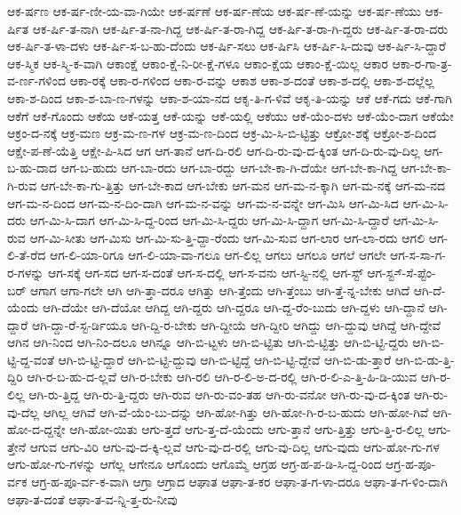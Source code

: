 {ಆಕ-ರ್ಷಣ
ಆಕ-ರ್ಷ-ಣೀ-ಯ-ವಾ-ಗಿಯೇ
ಆಕ-ರ್ಷಣೆ
ಆಕ-ರ್ಷ-ಣೆಯ
ಆಕ-ರ್ಷ-ಣೆ-ಯನ್ನು
ಆಕ-ರ್ಷ-ಣೆಯು
ಆಕ-ರ್ಷಿತ
ಆಕ-ರ್ಷಿ-ತ-ನಾಗಿ
ಆಕ-ರ್ಷಿ-ತ-ನಾ-ಗಿದ್ದ
ಆಕ-ರ್ಷಿ-ತ-ರಾ-ಗಿದ್ದ
ಆಕ-ರ್ಷಿ-ತ-ರಾ-ಗಿ-ದ್ದರು
ಆಕ-ರ್ಷಿ-ತ-ರಾ-ದರು
ಆಕ-ರ್ಷಿ-ತ-ಳಾ-ದಳು
ಆಕ-ರ್ಷಿ-ಸ-ಬ-ಹು-ದೆಂದು
ಆಕ-ರ್ಷಿ-ಸಲು
ಆಕ-ರ್ಷಿಸಿ
ಆಕ-ರ್ಷಿ-ಸಿ-ದುವು
ಆಕ-ರ್ಷಿ-ಸಿ-ದ್ದಾರೆ
ಆಕ-ಸ್ಮಿಕ
ಆಕ-ಸ್ಮಿ-ಕ-ವಾಗಿ
ಆಕಾಂಕ್ಷೆ
ಆಕಾಂ-ಕ್ಷೆ-ನಿ-ರೀ-ಕ್ಷೆ-ಗಳೂ
ಆಕಾಂ-ಕ್ಷೆಯ
ಆಕಾಂ-ಕ್ಷೆ-ಯಿಲ್ಲ
ಆಕಾರ
ಆಕಾ-ರ-ಗಾ-ತ್ರ-ವ-ರ್ಣ-ಗಳಿಂದ
ಆಕಾ-ರಕ್ಕೆ
ಆಕಾ-ರ-ಗಳಿಂದ
ಆಕಾ-ರ-ವನ್ನು
ಆಕಾಶ
ಆಕಾ-ಶ-ದಂತೆ
ಆಕಾ-ಶ-ದಲ್ಲಿ
ಆಕಾ-ಶ-ದಲ್ಲೆಲ್ಲ
ಆಕಾ-ಶ-ದಿಂದ
ಆಕಾ-ಶ-ಬಾ-ಣ-ಗಳನ್ನು
ಆಕಾ-ಶ-ಯಾ-ನದ
ಆಕೃ-ತಿ-ಗ-ಳಿವೆ
ಆಕೃ-ತಿ-ಯನ್ನು
ಆಕೆ
ಆಕೆ-ಗದು
ಆಕೆ-ಗಾಗಿ
ಆಕೆಗೆ
ಆಕೆ-ಗೊಂದು
ಆಕೆಯ
ಆಕೆ-ಯತ್ತ
ಆಕೆ-ಯನ್ನು
ಆಕೆ-ಯಲ್ಲಿ
ಆಕೆಯು
ಆಕೆ-ಯೆಂ-ದಳು
ಆಕೆ-ಯೆಂ-ದಾಗ
ಆಕೆಯೇ
ಆಕ್ರಂ-ದ-ನಕ್ಕೆ
ಆಕ್ರ-ಮಣ
ಆಕ್ರ-ಮ-ಣ-ಗಳ
ಆಕ್ರ-ಮ-ಣ-ದಿಂದ
ಆಕ್ರ-ಮಿ-ಸಿ-ಬಿ-ಟ್ಟಿತ್ತು
ಆಕ್ರೋ-ಶಕ್ಕೆ
ಆಕ್ರೋ-ಶ-ದಿಂದ
ಆಕ್ಷೇ-ಪ-ಣೆ-ಯೆತ್ತಿ
ಆಕ್ಷೇ-ಪಿ-ಸಿದ
ಆಗ
ಆಗ-ತಾನೆ
ಆಗ-ದಿ-ರಲಿ
ಆಗ-ದಿ-ರು-ವು-ದ-ಕ್ಕಿಂತ
ಆಗ-ದಿ-ರು-ವು-ದಿಲ್ಲ
ಆಗ-ಬ-ಹು-ದಾದ
ಆಗ-ಬ-ಹುದು
ಆಗ-ಬಾ-ರದು
ಆಗ-ಬಾ-ರದ್ದು
ಆಗ-ಬೇ-ಕಾ-ಗಿ-ದೆಯೇ
ಆಗ-ಬೇ-ಕಾ-ಗಿದ್ದ
ಆಗ-ಬೇ-ಕಾ-ಗಿ-ರುವ
ಆಗ-ಬೇ-ಕಾ-ಗು-ತ್ತಿತ್ತು
ಆಗ-ಬೇ-ಕಾದ
ಆಗ-ಬೇಕು
ಆಗ-ಮನ
ಆಗ-ಮ-ನ-ಕ್ಕಾಗಿ
ಆಗ-ಮ-ನಕ್ಕೆ
ಆಗ-ಮ-ನದ
ಆಗ-ಮ-ನ-ದಿಂದ
ಆಗ-ಮ-ನ-ದಿಂ-ದಾಗಿ
ಆಗ-ಮ-ನ-ವನ್ನು
ಆಗ-ಮ-ನ-ವನ್ನೇ
ಆಗ-ಮಿಸಿ
ಆಗ-ಮಿ-ಸಿದ
ಆಗ-ಮಿ-ಸಿ-ದರು
ಆಗ-ಮಿ-ಸಿ-ದಾಗ
ಆಗ-ಮಿ-ಸಿ-ದ್ದ-ರಿಂದ
ಆಗ-ಮಿ-ಸಿ-ದ್ದರು
ಆಗ-ಮಿ-ಸಿ-ದ್ದಾಗ
ಆಗ-ಮಿ-ಸಿ-ದ್ದಾರೆ
ಆಗ-ಮಿ-ಸಿ-ರುವ
ಆಗ-ಮಿ-ಸೀತು
ಆಗ-ಮಿಸು
ಆಗ-ಮಿ-ಸು-ತ್ತಿ-ದ್ದಾ-ರೆಂದು
ಆಗ-ಮಿ-ಸುವ
ಆಗ-ಲಾರ
ಆಗ-ಲಾ-ರದು
ಆಗಲಿ
ಆಗ-ಲಿ-ತೆ-ರೆದ
ಆಗ-ಲಿ-ಯಾ-ರಿಗೂ
ಆಗ-ಲಿ-ಯಾ-ವಾ-ಗಲೂ
ಆಗ-ಲಿಲ್ಲ
ಆಗಲು
ಆಗಲೂ
ಆಗಲೆ
ಆಗಲೇ
ಆಗ-ಸ-ಸಾ-ಗ-ರ-ಗಳನ್ನು
ಆಗ-ಸಕ್ಕೆ
ಆಗ-ಸದ
ಆಗ-ಸ-ದಂತೆ
ಆಗ-ಸ-ದಲ್ಲಿ
ಆಗ-ಸ-ವನು
ಆಗ-ಸ್ಟಿ-ನಲ್ಲಿ
ಆಗ-ಸ್ಟ್
ಆಗ-ಸ್ಟ-್-ಸೆ-ಪ್ಟೆಂ-ಬರ್
ಆಗಾಗ
ಆಗಾ-ಗಲೇ
ಆಗಿ
ಆಗಿ-ತ್ತಾ-ದರೂ
ಆಗಿತ್ತು
ಆಗಿ-ತ್ತೆಂದು
ಆಗಿ-ತ್ತೆಂಬು
ಆಗಿ-ತ್ತೆ-ನ್ನ-ಬೇಕು
ಆಗಿದೆ
ಆಗಿ-ದೆ-ಯೆಂದು
ಆಗಿ-ದೆಯೇ
ಆಗಿ-ದೆಯೋ
ಆಗಿದ್ದ
ಆಗಿ-ದ್ದರು
ಆಗಿ-ದ್ದರೂ
ಆಗಿ-ದ್ದ-ರೆಂ-ಬುದು
ಆಗಿ-ದ್ದಳು
ಆಗಿ-ದ್ದಾನೆ
ಆಗಿ-ದ್ದಾರೆ
ಆಗಿ-ದ್ದಾ-ರೆ-ಸ್ಟ-ರ್ಡಿಯೂ
ಆಗಿ-ದ್ದಿ-ರ-ಬೇಕು
ಆಗಿ-ದ್ದೀಯೆ
ಆಗಿ-ದ್ದೀರಿ
ಆಗಿದ್ದು
ಆಗಿ-ದ್ದುವು
ಆಗಿದ್ದೆ
ಆಗಿ-ದ್ದೇವೆ
ಆಗಿನ
ಆಗಿ-ನಿಂದ
ಆಗಿ-ನಿಂ-ದಲೂ
ಆಗಿನ್ನೂ
ಆಗಿ-ಬಿ-ಟ್ಟಳು
ಆಗಿ-ಬಿ-ಟ್ಟಿತು
ಆಗಿ-ಬಿ-ಟ್ಟಿತ್ತು
ಆಗಿ-ಬಿ-ಟ್ಟಿ-ದ್ದರು
ಆಗಿ-ಬಿ-ಟ್ಟಿ-ದ್ದ-ವಂತೆ
ಆಗಿ-ಬಿ-ಟ್ಟಿ-ದ್ದಾರೆ
ಆಗಿ-ಬಿ-ಟ್ಟಿ-ದ್ದುವು
ಆಗಿ-ಬಿ-ಟ್ಟಿದ್ದೆ
ಆಗಿ-ಬಿ-ಟ್ಟಿ-ದ್ದೇವೆ
ಆಗಿ-ಬಿ-ಡು-ತ್ತಾರೆ
ಆಗಿ-ಬಿ-ಡು-ತ್ತಿ-ದ್ದಿರಿ
ಆಗಿ-ರ-ಬ-ಹು-ದ-ಲ್ಲವೆ
ಆಗಿ-ರ-ಬೇಕು
ಆಗಿ-ರಲಿ
ಆಗಿ-ರ-ಲಿ-ಅ-ದ-ರಲ್ಲಿ
ಆಗಿ-ರ-ಲಿ-ಎ-ತ್ತಿ-ಹಿ-ಡಿ-ಯುವ
ಆಗಿ-ರ-ಲಿಲ್ಲ
ಆಗಿ-ರು-ತ್ತಿದ್ದ
ಆಗಿ-ರು-ತ್ತಿ-ದ್ದರು
ಆಗಿ-ರುವ
ಆಗಿ-ರು-ವಂ-ತಹ
ಆಗಿ-ರು-ವನೋ
ಆಗಿ-ರು-ವು-ದ-ಕ್ಕಿಂತ
ಆಗಿ-ರು-ವು-ದೆಲ್ಲ
ಆಗಿಲ್ಲ
ಆಗಿವೆ
ಆಗಿ-ವೆ-ಯೆಂ-ಬು-ದನ್ನು
ಆಗಿ-ಹೋ-ಗಿತ್ತು
ಆಗಿ-ಹೋ-ಗಿ-ರ-ಬ-ಹುದು
ಆಗಿ-ಹೋ-ಗಿವೆ
ಆಗಿ-ಹೋ-ದ-ದ್ದನ್ನೇ
ಆಗಿ-ಹೋ-ಯಿತು
ಆಗು-ತ್ತದೆ
ಆಗು-ತ್ತ-ದೆ-ಯೆಂದು
ಆಗು-ತ್ತಾನೆ
ಆಗು-ತ್ತಿತ್ತು
ಆಗು-ತ್ತಿ-ರ-ಲಿಲ್ಲ
ಆಗು-ತ್ತೇನೆ
ಆಗುವ
ಆಗು-ವಿರಿ
ಆಗು-ವು-ದ-ಕ್ಕಿ-ಲ್ಲವೆ
ಆಗು-ವು-ದ-ರಲ್ಲಿ
ಆಗು-ವು-ದಿಲ್ಲ
ಆಗು-ವುದು
ಆಗು-ಹೋ-ಗು-ಗಳ
ಆಗು-ಹೋ-ಗು-ಗಳನ್ನು
ಆಗೆಲ್ಲ
ಆಗೇನೂ
ಆಗೊಂದು
ಆಗೊಮ್ಮೆ
ಆಗ್ರಹ
ಆಗ್ರ-ಹ-ಪ-ಡಿ-ಸಿ-ದ್ದ-ರಿಂದ
ಆಗ್ರ-ಹ-ಪೂ-ರ್ವಕ
ಆಗ್ರ-ಹ-ಪೂ-ರ್ವ-ಕ-ವಾಗಿ
ಆಗ್ರಾ
ಆಗ್ರಾದ
ಆಘಾತ
ಆಘಾ-ತ-ಕರ
ಆಘಾ-ತ-ಗ-ಳಾ-ದರೂ
ಆಘಾ-ತ-ಗ-ಳಿಂ-ದಾಗಿ
ಆಘಾ-ತ-ದಂತೆ
ಆಘಾ-ತ-ವ-ನ್ನಿ-ತ್ತ-ರು-ನೀವು
}
